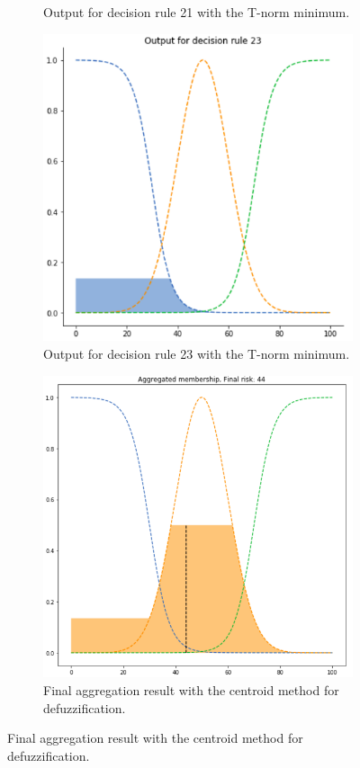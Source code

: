 \documentclass[conference]{IEEEtran}
\begin{document}
\begin{figure}[ht]
\begin{subfigure}{.5\textwidth}
  \caption{Output for decision rule 21 with the T-norm minimum.}
  \label{fig:3min2}
\end{subfigure}
\begin{subfigure}{.5\textwidth}
  \centering
  \includegraphics[width=.8\linewidth]{figures/third/min3.png}  
  \caption{Output for decision rule 23 with the T-norm minimum.}
  \label{fig:3min3}
\end{subfigure}
\begin{subfigure}{.5\textwidth}
  \centering
  \includegraphics[width=.8\linewidth]{figures/third/min-centroid.png}  
  \caption{Final aggregation result with the centroid method for defuzzification.}

\end{subfigure}
\end{figure}
\end{document}
